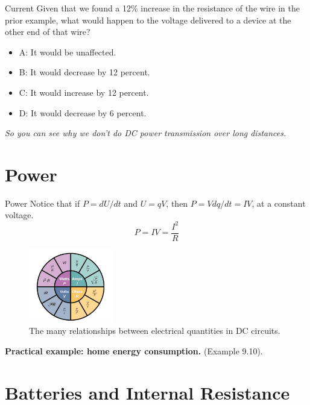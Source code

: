 \documentclass{beamer}
\begin{document}
\begin{frame}{Current}
Given that we found a 12\% increase in the resistance of the wire in the prior example, what would happen to the voltage delivered to a device at the other end of that wire?
\begin{itemize}
\item A: It would be unaffected.
\item B: It would decrease by 12 percent.
\item C: It would increase by 12 percent.
\item D: It would decrease by 6 percent.
\end{itemize}
\textit{So you can see why we don't do DC power transmission over long distances.}
\end{frame}

\section{Power}

\begin{frame}{Power}
Notice that if $P = dU/dt$ and $U = qV$, then $P = V dq/dt = IV$, at a constant voltage.
\begin{equation}
P = IV = \frac{I^2}{R}
\end{equation}
\begin{figure}
\centering
\includegraphics[width=0.33\textwidth]{figures/wheel.png}
\caption{\label{fig:power} The many relationships between electrical quantities in DC circuits.}
\end{figure}
\textbf{Practical example: home energy consumption.} (Example 9.10).
\end{frame}

\section{Batteries and Internal Resistance}
\end{document}
